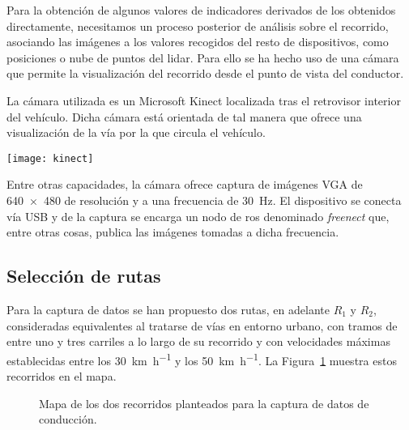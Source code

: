 Para la obtención de algunos valores de indicadores derivados de los obtenidos directamente, necesitamos un proceso posterior de análisis sobre el recorrido, asociando las imágenes a los valores recogidos del resto de dispositivos, como posiciones o nube de puntos del \acrshort{lidar}. Para ello se ha hecho uso de una cámara que permite la visualización del recorrido desde el punto de vista del conductor.

La cámara utilizada es un Microsoft Kinect localizada tras el retrovisor interior del vehículo. Dicha cámara está orientada de tal manera que ofrece una visualización de la vía por la que circula el vehículo.

\begin{marginfigure}
	\centering
	\texttt{[image: kinect]}
	\caption[Cámara Microsoft Kinect]{La cámara Kinect desarrollada por Microsoft ofrece imágenes a color a una velocidad de \SI{30}{\fps} con una resolución de \SI{640x480}{\px}.}
	\label{fig:kinect}
\end{marginfigure}

Entre otras capacidades, la cámara ofrece captura de imágenes VGA de \SI{640x480}{\px} de resolución y a una frecuencia de \SI{30}{\Hz}. El dispositivo se conecta vía USB y de la captura se encarga un nodo de \acrshort{ros} denominado \textit{freenect} 	que, entre otras cosas, publica las imágenes tomadas a dicha frecuencia.

\subsection{Selección de rutas}

Para la captura de datos se han propuesto dos rutas, en adelante $R_1$ y $R_2$, consideradas equivalentes al tratarse de vías en entorno urbano, con tramos de entre uno y tres carriles a lo largo de su recorrido y con velocidades máximas establecidas entre los \SI{30}{\km\per\hour} y los \SI{50}{\km\per\hour}. La Figura~\ref{fig:proposed-routes} muestra estos recorridos en el mapa.

\begin{figure}
	\centering
	\qquad
	\caption[Mapa de los dos recorridos planteados para la captura de datos de conducción]{Mapa de los dos recorridos planteados para la captura de datos de conducción.}
	\label{fig:proposed-routes}
\end{figure}

